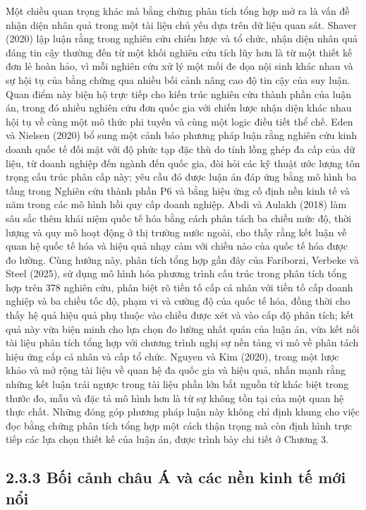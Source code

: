 \documentclass[
  a4paper,
  13pt]{extreport}
\begin{document}
Một chiều quan trọng khác mà bằng chứng phân tích tổng hợp mở ra là vấn
đề nhận diện nhân quả trong một tài liệu chủ yếu dựa trên dữ liệu quan
sát. Shaver (2020) lập luận rằng trong nghiên cứu chiến lược và tổ chức,
nhận diện nhân quả đáng tin cậy thường đến từ một khối nghiên cứu tích
lũy hơn là từ một thiết kế đơn lẻ hoàn hảo, vì mỗi nghiên cứu xử lý một
mối đe dọa nội sinh khác nhau và sự hội tụ của bằng chứng qua nhiều bối
cảnh nâng cao độ tin cậy của suy luận. Quan điểm này biện hộ trực tiếp
cho kiến trúc nghiên cứu thành phần của luận án, trong đó nhiều nghiên
cứu đơn quốc gia với chiến lược nhận diện khác nhau hội tụ về cùng một
mô thức phi tuyến và cùng một logic điều tiết thể chế. Eden và Nielsen
(2020) bổ sung một cảnh báo phương pháp luận rằng nghiên cứu kinh doanh
quốc tế đối mặt với độ phức tạp đặc thù do tính lồng ghép đa cấp của dữ
liệu, từ doanh nghiệp đến ngành đến quốc gia, đòi hỏi các kỹ thuật ước
lượng tôn trọng cấu trúc phân cấp này; yêu cầu đó được luận án đáp ứng
bằng mô hình ba tầng trong Nghiên cứu thành phần P6 và bằng hiệu ứng cố
định nền kinh tế và năm trong các mô hình hồi quy cấp doanh nghiệp. Abdi
và Aulakh (2018) làm sâu sắc thêm khái niệm quốc tế hóa bằng cách phân
tách ba chiều mức độ, thời lượng và quy mô hoạt động ở thị trường nước
ngoài, cho thấy rằng kết luận về quan hệ quốc tế hóa và hiệu quả nhạy
cảm với chiều nào của quốc tế hóa được đo lường. Cùng hướng này, phân
tích tổng hợp gần đây của Fariborzi, Verbeke và Steel (2025), sử dụng mô
hình hóa phương trình cấu trúc trong phân tích tổng hợp trên 378 nghiên
cứu, phân biệt rõ tiền tố cấp cá nhân với tiền tố cấp doanh nghiệp và ba
chiều tốc độ, phạm vi và cường độ của quốc tế hóa, đồng thời cho thấy hệ
quả hiệu quả phụ thuộc vào chiều được xét và vào cấp độ phân tích; kết
quả này vừa biện minh cho lựa chọn đo lường nhất quán của luận án, vừa
kết nối tài liệu phân tích tổng hợp với chương trình nghị sự nền tảng vi
mô về phân tách hiệu ứng cấp cá nhân và cấp tổ chức. Nguyen và Kim
(2020), trong một lược khảo và mở rộng tài liệu về quan hệ đa quốc gia
và hiệu quả, nhấn mạnh rằng những kết luận trái ngược trong tài liệu
phần lớn bắt nguồn từ khác biệt trong thước đo, mẫu và đặc tả mô hình
hơn là từ sự không tồn tại của một quan hệ thực chất. Những đóng góp
phương pháp luận này không chỉ định khung cho việc đọc bằng chứng phân
tích tổng hợp một cách thận trọng mà còn định hình trực tiếp các lựa
chọn thiết kế của luận án, được trình bày chi tiết ở Chương 3.

\hypertarget{bux1ed1i-cux1ea3nh-chuxe2u-uxe1-vuxe0-cuxe1c-nux1ec1n-kinh-tux1ebf-mux1edbi-nux1ed5i}{%
\subsection{2.3.3 Bối cảnh châu Á và các nền kinh tế mới
nổi}\label{bux1ed1i-cux1ea3nh-chuxe2u-uxe1-vuxe0-cuxe1c-nux1ec1n-kinh-tux1ebf-mux1edbi-nux1ed5i}}
\end{document}
